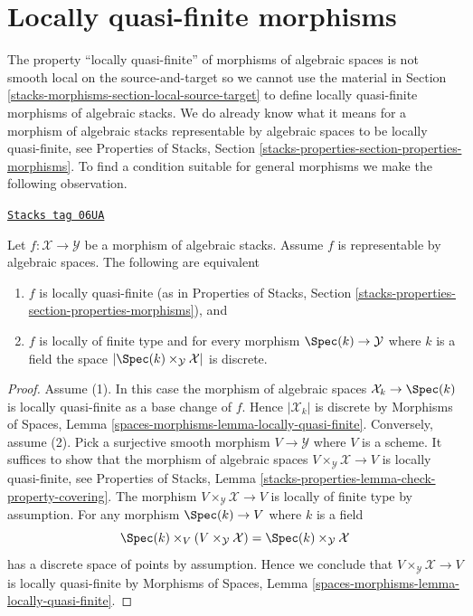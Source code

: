 \section{Locally quasi-finite morphisms}
\label{stacks-morphisms-section-locally-quasi-finite}
The property ``locally quasi-finite'' of morphisms of algebraic spaces
is not smooth local on the source-and-target so we cannot use the material in
Section \ref{stacks-morphisms-section-local-source-target}
to define locally quasi-finite morphisms of algebraic stacks.
We do already know what it means for a morphism of algebraic stacks
representable by algebraic spaces to be locally quasi-finite, see
Properties of Stacks, Section
\ref{stacks-properties-section-properties-morphisms}.
To find a condition suitable for general morphisms we make the following
observation.

\begin{lemma}
\label{stacks-morphisms-lemma-representable-by-spaces-quasi-finite}
\href{https://stacks.math.columbia.edu/tag/06UA}{\texttt{Stacks tag 06UA}}

Let $f : \mathcal{X} \to \mathcal{Y}$ be a morphism of algebraic stacks.
Assume $f$ is representable by algebraic spaces.
The following are equivalent
\begin{enumerate}
\item $f$ is locally quasi-finite (as in Properties of Stacks,
Section \ref{stacks-properties-section-properties-morphisms}), and
\item $f$ is locally of finite type and for every morphism
$\Spec(k) \to \mathcal{Y}$ where $k$ is a field the
space $|\Spec(k) \times_\mathcal{Y} \mathcal{X}|$ is discrete.
\end{enumerate}
\end{lemma}

\begin{proof}
Assume (1). In this case the morphism of algebraic spaces
$\mathcal{X}_k \to \Spec(k)$ is locally quasi-finite as a base change
of $f$. Hence $|\mathcal{X}_k|$ is discrete by
Morphisms of Spaces, Lemma \ref{spaces-morphisms-lemma-locally-quasi-finite}.
Conversely, assume (2). Pick a surjective smooth morphism
$V \to \mathcal{Y}$ where $V$ is a scheme. It suffices to show that the
morphism of algebraic spaces $V \times_\mathcal{Y} \mathcal{X} \to V$
is locally quasi-finite, see
Properties of Stacks, Lemma
\ref{stacks-properties-lemma-check-property-covering}.
The morphism $V \times_\mathcal{Y} \mathcal{X} \to V$ is locally of finite
type by assumption. For any morphism $\Spec(k) \to V$ where $k$ is a
field
$$
\Spec(k) \times_V (V \times_\mathcal{Y} \mathcal{X}) =
\Spec(k) \times_\mathcal{Y} \mathcal{X}
$$
has a discrete space of points by assumption. Hence we conclude that
$V \times_\mathcal{Y} \mathcal{X} \to V$ is locally quasi-finite by
Morphisms of Spaces, Lemma \ref{spaces-morphisms-lemma-locally-quasi-finite}.
\end{proof}


